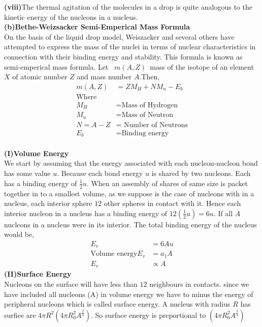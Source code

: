 \textbf{(viii)}\quad The thermal agitation of the molecules in a drop is quite analogous to the kinetic energy of the nucleons in a nucleus.\\
\textbf{(b)\quad Bethe-Weizsacker Semi-Emperical Mass Formula}\\
On the basis of the liquid drop model, Weiszacker and several others have attempted to express the mass of the nuclei in terms of nuclear characteristics in connection with their binding energy and stability. This formula is known as semi-emperical mass formula. Let \ $m(A,Z)$\ mass of the isotope of an element $X$ of atomic number $Z$ and mass number $A$.Then,
\begin{align*}
m(A,Z)&=ZM_H+NM_n-E_b\\
\text{Where}\\
M_H&=\text{Mass of Hydrogen}\\
M_n&=\text{Mass of Neutron}\\
N=A-Z&=\text{ Number of Neutrons}\\
E_b&=\text{Binding energy}
\end{align*}
\\
\textbf{(I)\quad Volume Energy}\\
We start by assuming that the energy associated with each nucleon-nucleon bond has some value $u$. Because each bond energy $u$ is shared by two nucleons. Each has a binding energy of $\frac{1}{2}u$. When an assembly of shares of same size is packet together in to a smallest volume, as we suppose is the case of nucleons with in a nucleus, each interior sphere $12$ other spheres in contact with it. Hence each interior nucleon in a nucleus has a binding  energy of $12(\frac{1}{2}u)=6u$. If all $A$ nucleons in a nucleus were in its interior. The total binding energy of the nucleus would be,
\begin{align*}
E_v&=6Au\\
\text{Volume energy} E_v&=a_1 A\\
E_v&\propto A
\end{align*}
\textbf{(II)\quad Surface Energy}\\
Nucleons on the surface will have less than $12$ neighbours in contacts. since we have included all nucleons (A) in volume energy we have to minus the energy of peripheral nucleons which is called surface energy. A nucleus with radius $R$ has surfice are $4\pi R^2(4\pi R^2_0A^\frac{2}{3})$. So surface energy is preportional to $(4\pi R^2_0A^\frac{2}{3}) $\\
